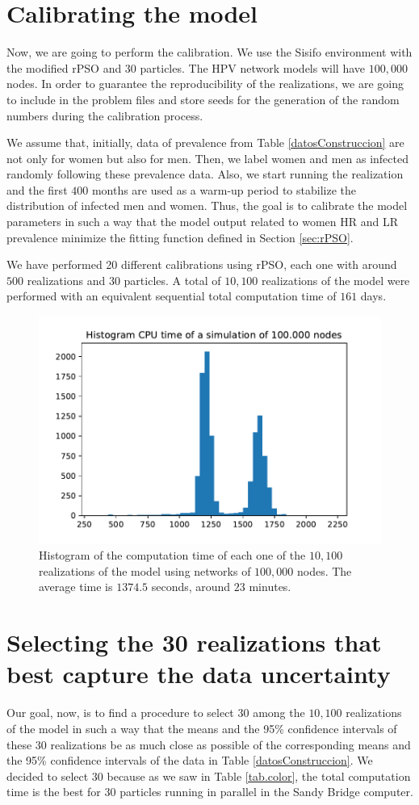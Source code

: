 \section{Calibrating the model}
Now, we are going to perform the calibration. We use the Sisifo environment with the modified rPSO and 30 particles. The HPV network models will have $100,000$ nodes. In order to guarantee the reproducibility of the realizations, we are going to include in the problem files and store seeds for the generation of the random numbers during the calibration process.

We assume that, initially, data of prevalence from Table \ref{datosConstruccion} are not only for women but also for men. Then, we label women and men as infected randomly following these prevalence data. Also, we start running the realization and the first $400$ months are used as a warm-up period to stabilize the distribution of infected men and women. Thus, the goal is to calibrate the model parameters in such a way that the model output related to women HR and LR prevalence minimize the fitting function defined in Section \ref{sec:rPSO}.

We have performed 20 different calibrations using rPSO, each one with around $500$ realizations and $30$ particles. A total of $10,100$ realizations of the model were performed with an equivalent sequential total computation time of $161$ days.

\begin{figure}[h!]
	\centering
	\includegraphics[width=0.6\linewidth]{IMGs/1.-Calibrado/Hist_CPU_time.pdf}
	\caption{Histogram of the computation time of each one of the $10,100$ realizations of the model using networks of $100,000$ nodes. The average time is $1374.5$ seconds, around $23$ minutes.}
\end{figure}

\section{Selecting the 30 realizations that best capture the data uncertainty}
Our goal, now, is to find a procedure to select $30$ among the $10,100$ realizations of the model in such a way that the means and the 95\% confidence intervals of these $30$ realizations be as much close as possible of the corresponding means and the 95\% confidence intervals of the data in Table \ref{datosConstruccion}. We decided to select $30$ because as we saw in Table \ref{tab.color}, the total computation time is the best for $30$ particles running in parallel in the Sandy Bridge computer.

